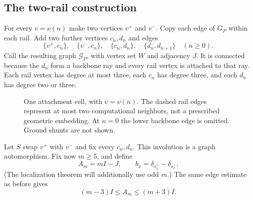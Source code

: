 \documentclass[11pt,letterpaper]{article}
\theoremstyle{definition}
\theoremstyle{remark}
\begin{document}
\subsection{The two-rail construction}
For every $v=\nu(n)$ make two vertices $v^+$ and $v^-$. Copy each edge of
$G_P$ within each rail. Add two further vertices $c_n,d_n$ and edges
\begin{equation}\label{ste:wc:eq:connect}
 \{v^+,c_n\},\quad\{v^-,c_n\},\quad\{c_n,d_n\},\quad
 \{d_n,d_{n+1}\}\quad(n\geq0).
\end{equation}
Call the resulting graph $\mathcal G_P$, with vertex set $W$ and adjacency
$J$. It is connected because the $d_n$ form a backbone ray and every rail
vertex is attached to that ray. Each rail vertex has degree at most three,
each $c_n$ has degree three, and each $d_n$ has degree two or three.

\begin{figure}[ht]
\centering
{}
\caption{One attachment cell, with $v=\nu(n)$. The dashed rail edges
represent at most two computational neighbors, not a prescribed geometric
embedding. At $n=0$ the lower backbone edge is omitted. Ground shunts are
not shown.}
\label{ste:wc:fig:cell}
\end{figure}

Let $S$ swap $v^+$ with $v^-$ and fix every $c_n,d_n$. This involution is
a graph automorphism. Fix now $m\geq5$, and define
\begin{equation}\label{ste:wc:eq:connectedA}
 A_m=mI-J,\qquad b_x=\delta_{s_x^+}-\delta_{s_x^-}.
\end{equation}
(The localization theorem will additionally use odd $m$.) The same edge
estimate as before gives
\begin{equation}\label{ste:wc:eq:connectedbound}
 (m-3)I\leq A_m\leq(m+3)I.
\end{equation}
\end{document}
